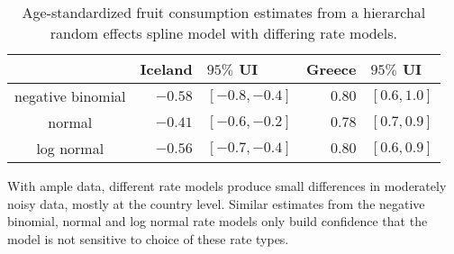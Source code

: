     \begin{table}[h]
        \begin{center}
        \begin{tabular}{|c|rl|rl|}
            \hline
                & Iceland&$95\%$ UI & Greece&$95\%$ UI \\
            \hline
                negative binomial & $-0.58$&$ [-0.8, -0.4]$ & $0.80$&$ [0.6, 1.0]$ \\
                normal & $-0.41$&$ [-0.6, -0.2]$ & $0.78$&$ [0.7, 0.9]$ \\
                log normal & $-0.56$& $[-0.7, -0.4]$ & $0.80$&$ [0.6, 0.9]$ \\
            \hline
        \end{tabular}
        \end{center}
        \caption{ Age-standardized fruit consumption estimates
          from a hierarchal random effects spline model with differing
          rate models.}
        \label{tab:app-fruit rfx}
    \end{table}

With ample data, different rate models produce small differences in 
moderately noisy data, mostly at the country level.  Similar estimates 
from the negative binomial, normal and log normal rate models only 
build confidence that the model is not sensitive to choice of these 
rate types. 
